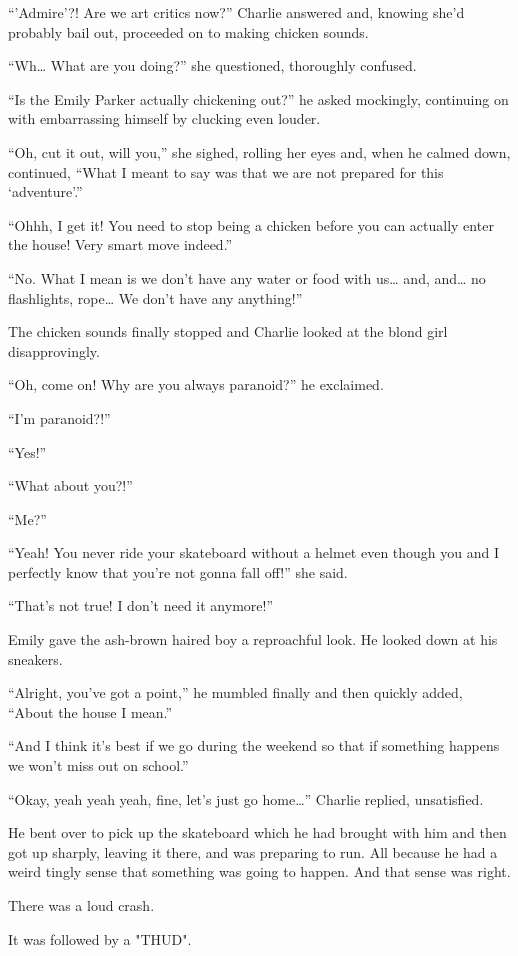 “’Admire’?! Are we art critics now?” Charlie answered and, knowing she'd probably bail out, proceeded on to making chicken sounds.

“Wh… What are you doing?” she questioned, thoroughly confused.

“Is the Emily Parker actually chickening out?” he asked mockingly, continuing on with embarrassing himself by clucking even louder.

“Oh, cut it out, will you,” she sighed, rolling her eyes and, when he calmed down, continued, “What I meant to say was that we are not prepared for this ‘adventure’.”

“Ohhh, I get it! You need to stop being a chicken before you can actually enter the house! Very smart move indeed.”

“No. What I mean is we don’t have any water or food with us… and, and… no flashlights, rope… We don’t have any anything!”

The chicken sounds finally stopped and Charlie looked at the blond girl disapprovingly.

“Oh, come on! Why are you always paranoid?” he exclaimed.

“I’m paranoid?!”

“Yes!”

“What about you?!”

“Me?”

“Yeah! You never ride your skateboard without a helmet even though you and I perfectly know that you’re not gonna fall off!” she said.

“That’s not true! I don’t need it anymore!”

Emily gave the ash-brown haired boy a reproachful look. He looked down at his sneakers.

“Alright, you’ve got a point,” he mumbled finally and then quickly added, “About the house I mean.”

“And I think it’s best if we go during the weekend so that if something happens we won't miss out on school.”

“Okay, yeah yeah yeah, fine, let’s just go home…” Charlie replied, unsatisfied.

He bent over to pick up the skateboard which he had brought with him and then got up sharply, leaving it there, and was preparing to run. All because he had a weird tingly sense that something was going to happen. And that sense was right.

There was a loud crash.

It was followed by a "THUD".

